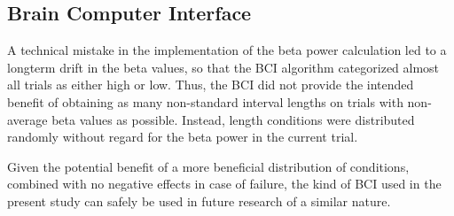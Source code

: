 \documentclass[man,floatsintext]{apa6} %
\begin{document}
\subsection{Brain Computer Interface}
A technical mistake in the implementation of the beta power
calculation led to a longterm drift in the beta values, so that the
BCI algorithm categorized almost all trials as either high or
low. Thus, the BCI did not provide the intended benefit of obtaining
as many non-standard interval lengths on trials with non-average beta
values as possible. Instead, length conditions were distributed
randomly without regard for the beta power in the current trial.

Given the potential benefit of a more beneficial distribution of
conditions, combined with no negative effects in case of failure, the
kind of BCI used in the present study can safely be used in future
research of a similar nature.










\end{document}
